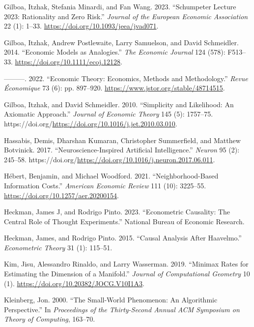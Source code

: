 \documentclass[
]{article}
\newlength{\cslhangindent}
\newenvironment{CSLReferences}[2] %
 {\begin{list}{}{%
  \setlength{\itemindent}{0pt}
  \setlength{\leftmargin}{0pt}
  \setlength{\parsep}{0pt}
  \ifodd #1
   \setlength{\leftmargin}{\cslhangindent}
   \setlength{\itemindent}{-1\cslhangindent}
  \fi
  \setlength{\itemsep}{#2\baselineskip}}}
 {\end{list}}
\begin{document}
\begin{CSLReferences}{1}{0}
Gilboa, Itzhak, Stefania Minardi, and Fan Wang. 2023. {``{Schumpeter
Lecture 2023: Rationality and Zero Risk}.''} \emph{Journal of the
European Economic Association} 22 (1): 1--33.
\url{https://doi.org/10.1093/jeea/jvad071}.

Gilboa, Itzhak, Andrew Postlewaite, Larry Samuelson, and David
Schmeidler. 2014. {``{Economic Models as Analogies}.''} \emph{The
Economic Journal} 124 (578): F513--33.
\url{https://doi.org/10.1111/ecoj.12128}.

---------. 2022. {``Economic Theory: Economics, Methods and
Methodology.''} \emph{Revue Économique} 73 (6): pp. 897--920.
\url{https://www.jstor.org/stable/48714515}.

Gilboa, Itzhak, and David Schmeidler. 2010. {``Simplicity and
Likelihood: An Axiomatic Approach.''} \emph{Journal of Economic Theory}
145 (5): 1757--75.
https://doi.org/\url{https://doi.org/10.1016/j.jet.2010.03.010}.

Hassabis, Demis, Dharshan Kumaran, Christopher Summerfield, and Matthew
Botvinick. 2017. {``Neuroscience-Inspired Artificial Intelligence.''}
\emph{Neuron} 95 (2): 245--58.
https://doi.org/\url{https://doi.org/10.1016/j.neuron.2017.06.011}.

Hébert, Benjamin, and Michael Woodford. 2021. {``Neighborhood-Based
Information Costs.''} \emph{American Economic Review} 111 (10):
3225--55. \url{https://doi.org/10.1257/aer.20200154}.

Heckman, James J, and Rodrigo Pinto. 2023. {``Econometric Causality: The
Central Role of Thought Experiments.''} National Bureau of Economic
Research.

Heckman, James, and Rodrigo Pinto. 2015. {``Causal Analysis After
Haavelmo.''} \emph{Econometric Theory} 31 (1): 115--51.

Kim, Jisu, Alessandro Rinaldo, and Larry Wasserman. 2019. {``Minimax
Rates for Estimating the Dimension of a Manifold.''} \emph{Journal of
Computational Geometry} 10 (1).
\url{https://doi.org/10.20382/JOCG.V10I1A3}.

Kleinberg, Jon. 2000. {``The Small-World Phenomenon: An Algorithmic
Perspective.''} In \emph{Proceedings of the Thirty-Second Annual ACM
Symposium on Theory of Computing}, 163--70.


\end{CSLReferences}
\end{document}
